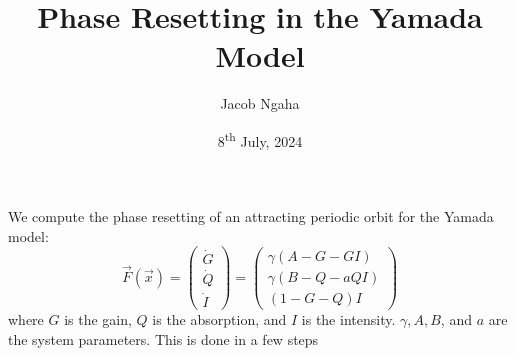 \documentclass[11pt]{article}
\title{Phase Resetting in the Yamada Model}
\author{Jacob Ngaha}
\date{8\textsuperscript{th} July, 2024}
\begin{document}
\maketitle

We compute the phase resetting of an attracting periodic orbit for the Yamada model:
\begin{equation}
  \vec{F} \left( \vec{x} \right) =
  \begin{pmatrix}
    \dot{G} \\
    \dot{Q} \\
    \dot{I}
  \end{pmatrix}
  =
  \begin{pmatrix}
    \gamma \left( A - G - G I \right)  \\
    \gamma \left( B - Q - a Q I \right)  \\
    \left( 1 - G - Q \right) I
  \end{pmatrix}
\end{equation}
where $G$ is the gain, $Q$ is the absorption, and $I$ is the intensity. $\gamma, A, B$, and $a$ are the system parameters. This is done in a few steps
\end{document}
